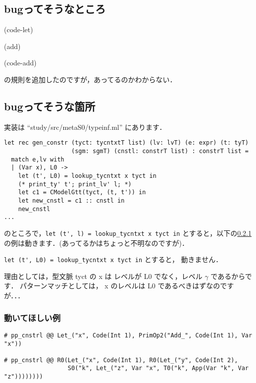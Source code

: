 \documentclass[dvipdfmx]{jsarticle}
\begin{document}
\subsection{bugってそうなところ}

(code-let)

(add)

(code-add)

の規則を追加したのですが，あってるのかわからない．

\subsection{bugってそうな箇所}

実装は ``study/src/metaS0/typeinf.ml'' にあります．

\begin{lstlisting}
let rec gen_constr (tyct: tycntxtT list) (lv: lvT) (e: expr) (t: tyT)
                   (sgm: sgmT) (cnstl: constrT list) : constrT list =
  match e,lv with
  | (Var x), L0 ->
    let (t', L0) = lookup_tycntxt x tyct in
    (* print_ty' t'; print_lv' l; *)
    let c1 = CModelGtt(tyct, (t, t')) in
    let new_cnstl = c1 :: cnstl in
    new_cnstl
...
\end{lstlisting}
のところで，\lstinline|let (t', l) = lookup_tycntxt x tyct in| とすると，以下の\ref{subsec:ex1}の例は動きます．(あってるかはちょっと不明なのですが)．

\lstinline|let (t', L0) = lookup_tycntxt x tyct in| とすると，
動きません．

理由としては，型文脈 tyct の x は レベルが L0 でなく，レベル $\gamma$  であるからです．
パターンマッチとしては， x のレベルは L0 であるべきはずなのですが．．．

\subsubsection{動いてほしい例}
\label{subsec:ex1}

\begin{lstlisting}
# pp_cnstrl @@ Let_("x", Code(Int 1), PrimOp2("Add_", Code(Int 1), Var "x"))

# pp_cnstrl @@ R0(Let_("x", Code(Int 1), R0(Let_("y", Code(Int 2),
                  S0("k", Let_("z", Var "x", T0("k", App(Var "k", Var "z"))))))))
\end{lstlisting}
\end{document}
